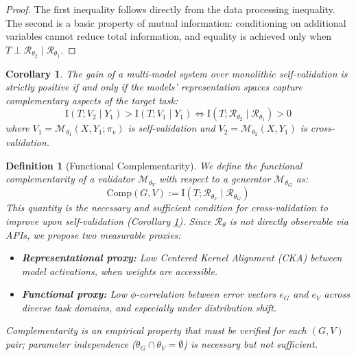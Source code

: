 \documentclass[11pt,a4paper]{article}
\newtheorem{definition}{Definition}[section]
\newtheorem{corollary}{Corollary}[section]
\theoremstyle{remark}
\newcommand{\MI}{\mathrm{I}}
\begin{document}
\begin{proof}
The first inequality follows directly from the data processing inequality. The second is a basic property of mutual information: conditioning on additional variables cannot reduce total information, and equality is achieved only when $T \perp \mathcal{R}_{\theta_2} \mid \mathcal{R}_{\theta_1}$.
\end{proof}

\begin{corollary}
\label{cor:diversity}
The gain of a multi-model system over monolithic self-validation is strictly positive if and only if the models' representation spaces capture complementary aspects of the target task:
\begin{equation}
  \MI(T; V_2 \mid Y_1) > \MI(T; V_1 \mid Y_1) \iff \MI(T; \mathcal{R}_{\theta_2} \mid \mathcal{R}_{\theta_1}) > 0
\end{equation}
where $V_1 = \mathcal{M}_{\theta_1}(X, Y_1; \pi_v)$ is self-validation and $V_2 = \mathcal{M}_{\theta_2}(X, Y_1)$ is cross-validation.
\end{corollary}

\begin{definition}[Functional Complementarity]
\label{def:complementarity}
We define the \emph{functional complementarity} of a validator $\mathcal{M}_{\theta_V}$ with respect to a generator $\mathcal{M}_{\theta_G}$ as:
\begin{equation}
  \mathrm{Comp}(G, V) := \MI(T; \mathcal{R}_{\theta_V} \mid \mathcal{R}_{\theta_G})
\end{equation}
This quantity is the necessary and sufficient condition for cross-validation to improve upon self-validation (Corollary \ref{cor:diversity}). Since $\mathcal{R}_\theta$ is not directly observable via APIs, we propose two measurable proxies:
\begin{itemize}
  \item \textbf{Representational proxy:} Low Centered Kernel Alignment (CKA) between model activations, when weights are accessible.
  \item \textbf{Functional proxy:} Low $\phi$-correlation between error vectors $e_G$ and $e_V$ across diverse task domains, and especially under distribution shift.
\end{itemize}
Complementarity is an empirical property that must be verified for each $(G, V)$ pair; parameter independence ($\theta_G \cap \theta_V = \emptyset$) is necessary but not sufficient.
\end{definition}
\end{document}
